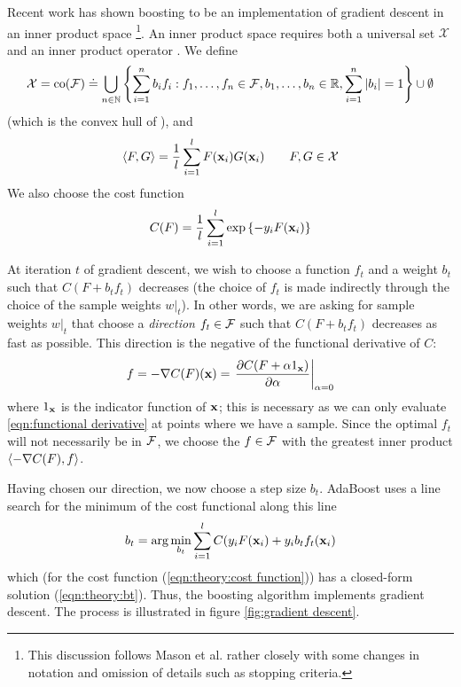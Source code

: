 Recent work has shown boosting to be an implementation of gradient
descent in an inner product space \cite{Mason99}\footnote{This
discussion follows Mason et al. \cite{Mason99} rather closely with
some changes in notation and omission of details such as stopping
criteria.}.
An inner product space requires both a universal set
$\mathcal{X}$ and an inner product operator \ip{\cdot}{\cdot}.  We
define
%
\begin{equation}
\mathcal{X} = 
\mathrm{co} (\mathcal{F}) \doteq
 \bigcup _{n \in \mathbb{N}}
\left\{
 \sum_{i=1}^{n}
  b_i
f_i : f_1, \ldots, f_n \in \mathcal{F},
 b_1, \ldots, b_n \in \mathbb{R},
 \sum_{i=1}^{n} | b_i | = 1
\right\} \cup \emptyset
\end{equation}
%
(which is the convex hull of \calF), and
%
\begin{equation}
\langle {F} , {G} \rangle = \frac{1}{l} \sum_{i=1}^{l} F(\mathbf{x}_i)G(\mathbf{x}_i) \qquad
F, G \in \mathcal{X}
\end{equation}
%
We also choose the cost function
%
\begin{equation}
C(F) = \frac{1}{l} \sum_{i=1}^{l} \exp
\left\{ -y_i F(\mathbf{x}_i) \right\}
\label{eqn:theory:cost function}
\end{equation}

At iteration $t$ of gradient descent, we wish to choose a function $f_t$ and
a weight $b_t$ such that $C(F + b_t f_t)$ decreases (the choice of
$f_t$ is made indirectly through the choice of the sample weights
$w|_t$).  In other words, we are asking for sample weights $w|_t$ that
choose a \emph{direction} $f_t \in \mathcal{F}$ such that $C(F + b_t f_t)$
decreases as fast as possible.  This direction is the negative of the
functional derivative of $C$:
%
\begin{equation}
f = -\nabla C(F)(\mathbf{x}) = \left. \frac{\partial C(F + \alpha
1_{\mathbf{x}})}{\partial \alpha} \right|_{\alpha = 0}
\label{eqn:functional derivative}
\end{equation}
%
where $1_{\mathbf{x}}$ is the indicator function of $\mathbf{x}$; this is
necessary as we can only evaluate \ref{eqn:functional derivative} at
points where we have a sample.  Since the
optimal $f_t$ will not necessarily be in $\mathcal{F}$, we choose the
$f \in \mathcal{F}$ with the greatest inner product $\langle {-\nabla
C(F)} , {f} \rangle$.

Having chosen our direction, we now choose a step size $b_t$.
AdaBoost uses a line search for the minimum of the cost functional
along this line
%
\begin{equation}
b_t = \arg \min_{b_t} \sum_{i=1}^{l} C(y_i F(\mathbf{x}_i) + y_i b_t f_t(\mathbf{x}_i)
\end{equation}
%
which (for the cost function (\ref{eqn:theory:cost
function})) has a closed-form solution  (\ref{eqn:theory:bt}).  Thus, the
boosting algorithm implements gradient descent.  The process is
illustrated in figure \ref{fig:gradient descent}.

